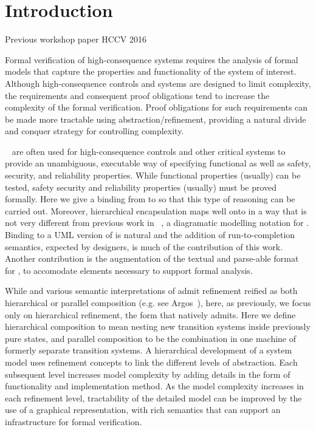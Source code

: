 
\section{Introduction}
\label{sec:introduction}

Previous workshop paper HCCV 2016~\cite{Morris_2016}

Formal verification of high-consequence systems requires the analysis
of formal models that capture the properties and functionality of the
system of interest. Although high-consequence controls and systems are
designed to limit complexity, the requirements and consequent proof
obligations tend to increase the complexity of the formal verification.  
Proof obligations for such requirements can be made more tractable using
abstraction/refinement, providing a natural divide and conquer
strategy for controlling complexity.

\Statecharts~\cite{Harel} are often used for high-consequence controls
and other critical systems to provide an unambiguous, executable way
of specifying functional as well as safety, security, and reliability
properties.  While functional properties (usually) can be tested,
safety security and reliability properties (usually) must be proved
formally.  Here we give a binding from \Statecharts to \EventB so that
this type of reasoning can be carried out.  Moreover, hierarchical
encapsulation maps well onto \Statecharts in a way that is not very
different from previous work in \iUMLB~\cite{Snook2006,snook14:_b_statem,Snook12:FMCO}, a diagramatic modelling notation for \EventB.
Binding \iUMLB to a UML version of \Statecharts is natural and the
addition of run-to-completion semantics, expected by \Statechart
designers, is much of the contribution of this work.  Another
contribution is the augmentation of the textual and parse-able format
for \Statecharts, \SCXML to accomodate elements necessary to support formal
analysis. 

While \Statecharts and various semantic interpretations of
\Statecharts admit refinement reified as both hierarchical or parallel
composition (e.g. see Argos~\cite{Maraninchi91theargos}), here, as
previously\cite{snook14:_b_statem}, we focus only on hierarchical
refinement, the form that \EventB natively admits.  Here we define
hierarchical composition to mean nesting new transition systems inside
previously pure states, and parallel composition to be the combination
in one machine of formerly separate transition systems.
A hierarchical development of a system model uses refinement
concepts to link the different levels of abstraction. Each subsequent
level increases model complexity by adding details in the form of
functionality and implementation method. As the model complexity
increases in each refinement level, tractability of the detailed model
can be improved by the use of a graphical representation, with rich
semantics that can support an infrastructure for formal verification.


